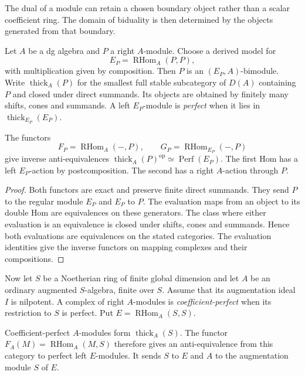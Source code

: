 The dual of a module can retain a chosen boundary object rather
than a scalar coefficient ring. The domain of biduality is then
determined by the objects generated from that boundary.

Let $A$ be a dg algebra and $P$ a right $A$-module. Choose a
derived model for
\[
 E_P=\operatorname{RHom}_A(P,P),
\]
with multiplication given by composition. Then $P$ is an
$(E_P,A)$-bimodule. Write $\operatorname{thick}_A(P)$ for the
smallest full stable subcategory of $D(A)$ containing $P$ and
closed under direct summands. Its objects are obtained by finitely
many shifts, cones and summands. A left $E_P$-module is
\emph{perfect} when it lies in $\operatorname{thick}_{E_P}(E_P)$.

\begin{proposition}
\label{v4-arith:md:prop:thick}
The functors
\[
 F_P=\operatorname{RHom}_A(-,P),\qquad
 G_P=\operatorname{RHom}_{E_P}(-,P)
\]
give inverse anti-equivalences
$\operatorname{thick}_A(P)^{\mathrm{op}}\simeq
\operatorname{Perf}(E_P)$. The first Hom has a left $E_P$-action
by postcomposition. The second has a right $A$-action through $P$.
\end{proposition}

\begin{proof}
Both functors are exact and preserve finite direct summands.
They send $P$ to the regular module $E_P$ and $E_P$ to $P$.
The evaluation maps from an object to its double Hom are
equivalences on these generators. The class where either
evaluation is an equivalence is closed under shifts, cones and
summands. Hence both evaluations are equivalences on the stated
categories. The evaluation identities give the inverse functors
on mapping complexes and their compositions.
\end{proof}

Now let $S$ be a Noetherian ring of finite global dimension and
let $A$ be an ordinary augmented $S$-algebra, finite over $S$.
Assume that its augmentation ideal $I$ is nilpotent. A complex
of right $A$-modules is \emph{coefficient-perfect} when its
restriction to $S$ is perfect. Put
$E=\operatorname{RHom}_A(S,S)$.

\begin{theorem}
\label{v4-arith:md:thm:marked}
Coefficient-perfect $A$-modules form $\operatorname{thick}_A(S)$.
The functor $F_A(M)=\operatorname{RHom}_A(M,S)$ therefore gives
an anti-equivalence from this category to perfect left
$E$-modules. It sends $S$ to $E$ and $A$ to the augmentation
module $S$ of $E$.
\end{theorem}

